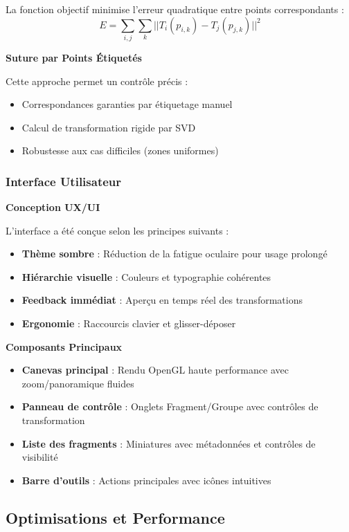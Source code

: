 \documentclass[12pt,a4paper]{article}
\begin{document}
La fonction objectif minimise l'erreur quadratique entre points correspondants :
\begin{equation}
E = \sum_{i,j} \sum_{k} ||T_i(p_{i,k}) - T_j(p_{j,k})||^2
\end{equation}

\textbf{Suture par Points Étiquetés}

Cette approche permet un contrôle précis :
\begin{itemize}
\item Correspondances garanties par étiquetage manuel
\item Calcul de transformation rigide par SVD
\item Robustesse aux cas difficiles (zones uniformes)
\end{itemize}

\subsubsection{Interface Utilisateur}

\textbf{Conception UX/UI}

L'interface a été conçue selon les principes suivants :
\begin{itemize}
\item \textbf{Thème sombre} : Réduction de la fatigue oculaire pour usage prolongé
\item \textbf{Hiérarchie visuelle} : Couleurs et typographie cohérentes
\item \textbf{Feedback immédiat} : Aperçu en temps réel des transformations
\item \textbf{Ergonomie} : Raccourcis clavier et glisser-déposer
\end{itemize}

\textbf{Composants Principaux}

\begin{itemize}
\item \textbf{Canevas principal} : Rendu OpenGL haute performance avec zoom/panoramique fluides
\item \textbf{Panneau de contrôle} : Onglets Fragment/Groupe avec contrôles de transformation
\item \textbf{Liste des fragments} : Miniatures avec métadonnées et contrôles de visibilité
\item \textbf{Barre d'outils} : Actions principales avec icônes intuitives
\end{itemize}

\subsection{Optimisations et Performance}
\end{document}
